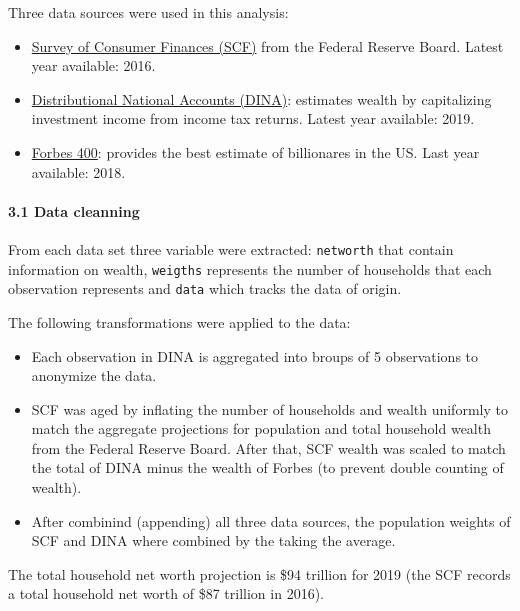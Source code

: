 \documentclass[]{article}
\providecommand{\tightlist}{%
  \setlength{\itemsep}{0pt}\setlength{\parskip}{0pt}}
\let\oldparagraph\paragraph
\renewcommand{\paragraph}[1]{\oldparagraph{#1}\mbox{}}
\begin{document}
Three data sources were used in this analysis:

\begin{itemize}
\tightlist
\item
  \href{https://www.federalreserve.gov/econres/scfindex.htm}{Survey of
  Consumer Finances (SCF)} from the Federal Reserve Board. Latest year
  available: 2016.\\
\item
  \href{http://gabriel-zucman.eu/usdina/}{Distributional National
  Accounts (DINA)}: estimates wealth by capitalizing investment income
  from income tax returns. Latest year available: 2019.\\
\item
  \href{https://www.forbes.com/forbes-400/\#4d358acf7e2f}{Forbes 400}:
  provides the best estimate of billionares in the US. Last year
  available: 2018.
\end{itemize}

\hypertarget{data-cleanning}{%
\paragraph{3.1 Data cleanning}\label{data-cleanning}}

From each data set three variable were extracted: \texttt{networth} that
contain information on wealth, \texttt{weigths} represents the number of
households that each observation represents and \texttt{data} which
tracks the data of origin.

The following transformations were applied to the data:

\begin{itemize}
\tightlist
\item
  Each observation in DINA is aggregated into broups of 5 observations
  to anonymize the data.\\
\item
  SCF was aged by inflating the number of households and wealth
  uniformly to match the aggregate projections for population and total
  household wealth from the Federal Reserve Board. After that, SCF
  wealth was scaled to match the total of DINA minus the wealth of
  Forbes (to prevent double counting of wealth).\\
\item
  After combinind (appending) all three data sources, the population
  weights of SCF and DINA where combined by the taking the average.
\end{itemize}

The total household net worth projection is \$94 trillion for 2019 (the
SCF records a total household net worth of \$87 trillion in 2016).
\end{document}
